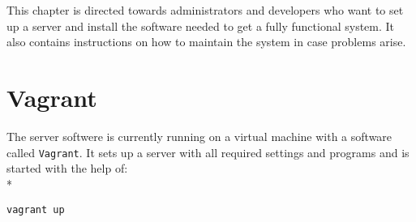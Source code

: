 This chapter is directed towards administrators and developers who want to
set up a server and install the software needed to get a fully functional system.
It also contains instructions on how to maintain the system in case problems arise.

\section{Vagrant}
The server softwere is currently running on a virtual machine with a software called \texttt{Vagrant}.
It sets up a server with all required settings and programs and is started with the help of:\\*
\begin{verbatim}
vagrant up
\end{verbatim}


